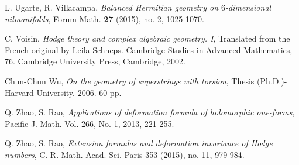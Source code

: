 \documentclass[12pt]{amsart}
\numberwithin{equation}{section}
\renewcommand{\1}{\mathds{1}}
\renewcommand{\>}{\rightarrow}
\begin{document}
\begin{thebibliography}{99}
 L. Ugarte, R. Villacampa,
\newblock \textit{Balanced Hermitian geometry on $6$-dimensional nilmanifolds},
\newblock Forum Math. \textbf{27} (2015), no. 2, 1025-1070.

 C. Voisin,
\newblock \textit{Hodge theory and complex algebraic geometry. I},
\newblock Translated from the French original by Leila Schneps.
Cambridge Studies in Advanced Mathematics, 76. Cambridge University
Press, Cambridge, 2002.


 Chun-Chun Wu,
\newblock \textit{On the geometry of superstrings with torsion},
\newblock Thesis (Ph.D.)-Harvard University. 2006. 60 pp.


  Q. Zhao, S. Rao,
\newblock \textit{Applications of deformation formula of holomorphic
one-forms},
\newblock Pacific J. Math. Vol. 266, No. 1, 2013,
221-255.

  Q. Zhao, S. Rao,
\newblock \textit{Extension formulas and deformation invariance of Hodge numbers},
\newblock C. R. Math. Acad. Sci. Paris 353
(2015), no. 11, 979-984.

\end{thebibliography}
\end{document}
